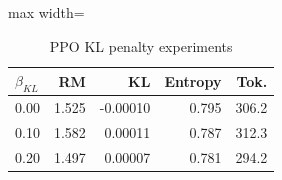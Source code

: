 \begin{table}[!htbp]
\centering

\scriptsize
\setlength{\tabcolsep}{3.4pt}
\begin{adjustbox}{max width=\linewidth}
\begin{tabular}{lrrrr}
\toprule
$\beta_{KL}$ & RM & KL & Entropy & Tok. \\
\midrule
0.00 & 1.525 & -0.00010 & 0.795 & 306.2 \\
0.10 & 1.582 & 0.00011 & 0.787 & 312.3 \\
0.20 & 1.497 & 0.00007 & 0.781 & 294.2 \\
\bottomrule
\end{tabular}
\end{adjustbox}

\caption{PPO KL penalty experiments}
\label{tab:ppo-kl}

\end{table}
